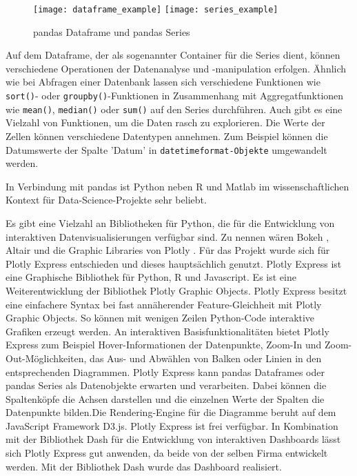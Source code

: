     
    \begin{figure}[h]
        \centering
            \texttt{[image: dataframe\_example]}
            \hspace{1cm}
            \texttt{[image: series\_example]}
            \caption{pandas Dataframe und pandas Series}
            \label{fig:pandas Dataframe und pandas Series}
    \end{figure}
    
    Auf dem Dataframe, der als sogenannter Container für die Series dient, können verschiedene Operationen der Datenanalyse und 
    -manipulation erfolgen. Ähnlich wie bei Abfragen einer Datenbank lassen sich verschiedene Funktionen wie \texttt{sort()}- oder \texttt{groupby()}-Funktionen in Zusammenhang
    mit Aggregatfunktionen wie \texttt{mean()}, \texttt{median()} oder \texttt{sum()} auf den Series durchführen.
    Auch gibt es eine Vielzahl von Funktionen, um die Daten rasch zu explorieren. Die Werte der Zellen können verschiedene Datentypen
    annehmen. Zum Beispiel können die Datumswerte der Spalte 'Datum' in \texttt{datetimeformat-Objekte} umgewandelt werden.

    In Verbindung mit pandas ist Python neben \textsf{R} und Matlab im wissenschaftlichen Kontext für Data-Science-Projekte sehr beliebt.
    
    Es gibt eine Vielzahl an Bibliotheken für Python, die für die Entwicklung von interaktiven Datenvisualisierungen verfügbar sind. Zu
    nennen wären Bokeh \cite[vgl.][]{van_de_ven_bokeh_2021}, Altair \cite[vgl.][]{altair_altair_2021} und die 
    Graphic Libraries von Plotly \cite[vgl.][]{plotly_plotly_2021}. Für das Projekt wurde sich für Plotly Express entschieden 
    und dieses hauptsächlich genutzt. 
    Plotly Express ist eine Graphische Bibliothek für Python, \textsf{R} und Javascript. Es ist eine Weiterentwicklung der Bibliothek Plotly Graphic Objects. 
    Plotly Express besitzt eine einfachere Syntax bei fast annäherender Feature-Gleichheit mit Plotly Graphic Objects. So können mit wenigen Zeilen Python-Code interaktive Grafiken erzeugt werden. 
    An interaktiven Basisfunktionalitäten bietet Plotly Express zum Beispiel Hover-Informationen der Datenpunkte, Zoom-In und Zoom-Out-Möglichkeiten,
    das Aus- und Abwählen von Balken oder Linien in den entsprechenden Diagrammen. Plotly Express kann pandas Dataframes 
    oder pandas Series als Datenobjekte erwarten und verarbeiten. Dabei können die Spaltenköpfe die Achsen darstellen 
    und die einzelnen Werte der Spalten die Datenpunkte bilden.Die Rendering-Engine für die Diagramme beruht auf dem JavaScript Framework D3.js. 
    Plotly Express ist frei verfügbar. In Kombination mit der Bibliothek Dash für die Entwicklung von interaktiven Dashboards lässt sich Plotly Express gut anwenden, 
    da beide von der selben Firma entwickelt werden. Mit der Bibliothek Dash wurde das Dashboard realisiert.
    
